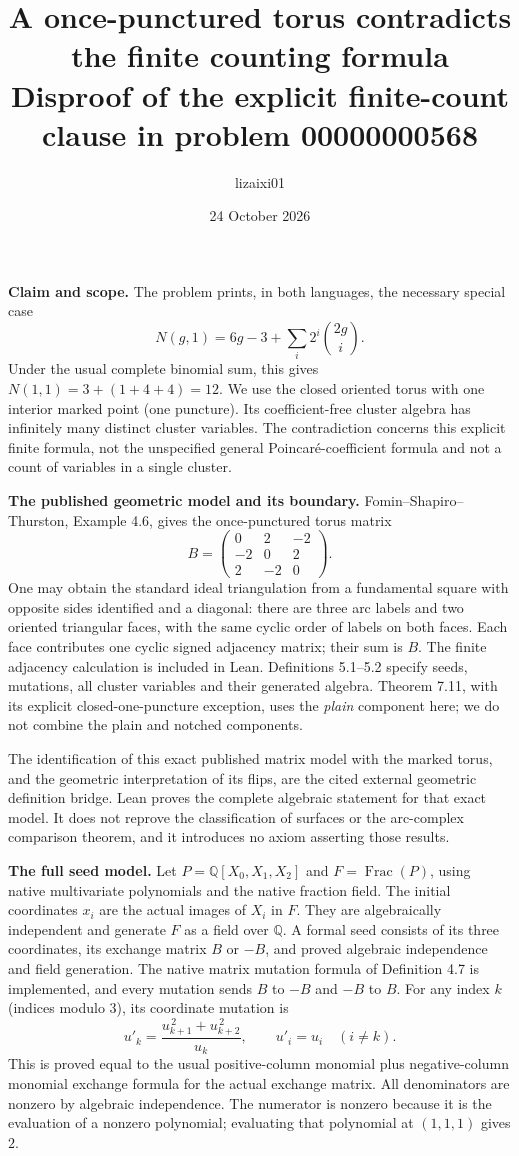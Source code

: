 \documentclass[10pt]{article}
\title{A once-punctured torus contradicts the finite counting formula\\
\large Disproof of the explicit finite-count clause in problem 00000000568}
\author{lizaixi01}
\date{24 October 2026}
\begin{document}
\maketitle
\vspace{-1em}

\textbf{Claim and scope.}
The problem prints, in both languages, the necessary special case
\[
 N(g,1)=6g-3+\sum_i2^i\binom{2g}{i}.
\]
Under the usual complete binomial sum, this gives $N(1,1)=3+(1+4+4)=12$.
We use the closed oriented torus with one interior marked point (one puncture).
Its coefficient-free cluster algebra has infinitely many distinct cluster variables.
The contradiction concerns this explicit finite formula, not the unspecified general
Poincar\'e-coefficient formula and not a count of variables in a single cluster.

\textbf{The published geometric model and its boundary.}
Fomin--Shapiro--Thurston, Example 4.6, gives the once-punctured torus matrix
\[
 B=\begin{pmatrix}0&2&-2\\-2&0&2\\2&-2&0\end{pmatrix}.
\]
One may obtain the standard ideal triangulation from a fundamental square with
opposite sides identified and a diagonal: there are three arc labels and two
oriented triangular faces, with the same cyclic order of labels on both faces.
Each face contributes one cyclic signed adjacency matrix; their sum is $B$.
The finite adjacency calculation is included in Lean.
Definitions 5.1--5.2 specify seeds, mutations, all cluster variables and their generated
algebra. Theorem 7.11, with its explicit closed-one-puncture exception, uses the
\emph{plain} component here; we do not combine the plain and notched components.

The identification of this exact published matrix model with the marked torus,
and the geometric interpretation of its flips, are the cited external geometric
definition bridge. Lean proves the complete algebraic statement for that exact
model. It does not reprove the classification of surfaces or the arc-complex
comparison theorem, and it introduces no axiom asserting those results.

\textbf{The full seed model.}
Let $P=\mathbb Q[X_0,X_1,X_2]$ and $F=\operatorname{Frac}(P)$, using native
multivariate polynomials and the native fraction field. The initial coordinates
$x_i$ are the actual images of $X_i$ in $F$. They are algebraically independent
and generate $F$ as a field over $\mathbb Q$.
A formal seed consists of its three coordinates, its exchange matrix $B$ or $-B$,
and proved algebraic independence and field generation. The native matrix mutation
formula of Definition 4.7 is implemented, and every mutation sends $B$ to $-B$
and $-B$ to $B$. For any index $k$ (indices modulo $3$), its coordinate mutation is
\[
 u'_k=\frac{u_{k+1}^{\,2}+u_{k+2}^{\,2}}{u_k},\qquad
 u'_i=u_i\quad(i\ne k).
\]
This is proved equal to the usual positive-column monomial plus negative-column
monomial exchange formula for the actual exchange matrix.
All denominators are nonzero by algebraic independence. The numerator is nonzero
because it is the evaluation of a nonzero polynomial; evaluating that polynomial
at $(1,1,1)$ gives $2$.
\end{document}
